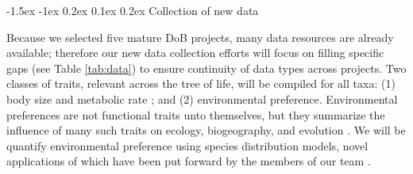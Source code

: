 \documentclass[11pt]{article}
\makeatletter
\renewcommand\subsubsection{\@startsection{subsection}{1}{\z@}%
                                  {-1.5ex \@plus -1ex \@minus 0.2ex}%
                                  {0.1ex \@plus 0.2ex}%
                                  {\normalfont\bfseries}}
\makeatother
\begin{document}
\subsubsection{Collection of new data} \label{collection-of-new-data}

Because we selected five mature DoB projects, many data resources are
already available; therefore our new data collection efforts will
focus on filling specific gaps (see Table \ref{tab:data}) to ensure
continuity of data types across projects. Two classes of traits,
relevant across the tree of life, will be compiled for all taxa: (1)
body size and metabolic rate \cite{brown2004, price2012}; and (2)
environmental preference. Environmental preferences are not functional
traits unto themselves, but they summarize the influence of many such
traits on ecology, biogeography, and evolution \cite{elith2009}. We
will be quantify environmental preference using species distribution
models, novel applications of which have been put forward by the
members of our team \citep[e.g.;][]{Owens2017-ja, Carnaval2014-je,
  Carnaval2008-og}.
\end{document}
